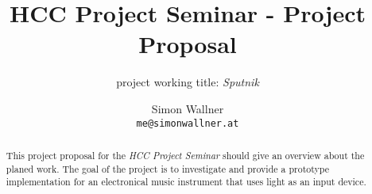 \documentclass[10pt,a4paper]{scrartcl}
\author{Simon Wallner\\\texttt{me@simonwallner.at}}
\title{HCC Project Seminar - Project Proposal}
\subtitle{project working title: \emph{Sputnik}}
\begin{document}
\maketitle

\begin{abstract}
This project proposal for the \emph{HCC Project Seminar} should give an overview about the planed work. The goal of the project is to investigate and provide a prototype implementation for an electronical music instrument that uses light as an input device.
\end{abstract}
\end{document}
